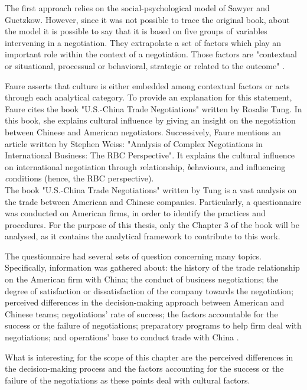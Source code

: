 \documentclass[../main.tex]{subfiles}
\begin{document}
The first approach relies on the social-psychological model of Sawyer and Guetzkow. However, since it was not possible to trace the original book, about the model it is possible to say that it is based on five groups of variables intervening in a negotiation. They extrapolate a set of factors which play an important role within the context of a negotiation. Those factors are "contextual or situational, processual or behavioral, strategic or related to the outcome" \autocite[192]{faure}.

Faure asserts that culture is either embedded among contextual factors or acts through each analytical category.
To provide an explanation for this statement, Faure cites the book "U.S.-China Trade Negotiations" written by Rosalie Tung. In this book, she explains cultural influence by giving an insight on the negotiation between Chinese and American negotiators. Successively, Faure mentions an article written by Stephen Weiss: "Analysis of Complex Negotiations in International Business: The RBC Perspective". It explains the cultural influence on international negotiation through \textit{r}elationship, \textit{b}ehaviours, and influencing \textit{c}onditions (hence, the RBC perspective).\\

The book "U.S.-China Trade Negotiations" written by Tung is a vast analysis on the trade between American and Chinese companies. Particularly, a questionnaire was conducted on American firms, in order to identify the practices and procedures. For the purpose of this thesis, only the Chapter 3 of the book will be analysed, as it contains the analytical framework to contribute to this work.

The questionnaire had several sets of question concerning many topics. Specifically, information was gathered about: the history of the trade relationship on the American firm with China; the conduct of business negotiations; the degree of satisfaction or dissatisfaction of the company towards the negotiation; perceived differences in the decision-making approach between American and Chinese teams; negotiations' rate of success; the factors accountable for the success or the failure of negotiations; preparatory programs to help firm deal with negotiations; and operations' base to conduct trade with China \autocite[56]{tung}.

What is interesting for the scope of this chapter are the perceived differences in the decision-making process and the factors accounting for the success or the failure of the negotiations as these points deal with cultural factors.
\end{document}
